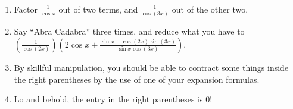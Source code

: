 \documentclass[english]{book}
\begin{document}
\begin{enumerate}
\begin{enumerate}
\begin{enumerate}[\hspace{1cm}a)]
                \item Factor $\frac{1}{\cos x}$ out of two terms, and $\frac{1}{\cos(3x)}$ out of the other two.
                \item Say ``Abra Cadabra'' three times, and reduce what you have to 
                   \\ $(\frac{1}{\cos(2x)}) (2 \cos x + \frac{\sin x - \cos(2x) \sin(3x)}{\sin x  \cos(3x)})$. 
                \item By skillful manipulation, you should be able to contract some things inside the right parentheses by the use of one of your expansion formulas.
                \item Lo and behold, the entry in the right parentheses is $0$!
              \end{enumerate}
        \end{enumerate}


\end{enumerate}
\end{document}
